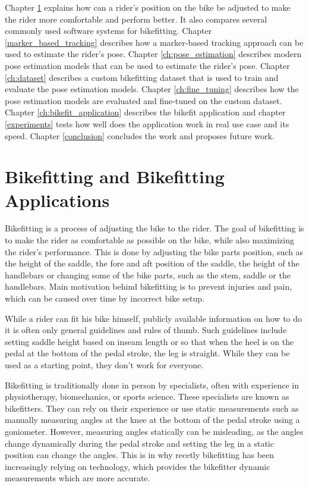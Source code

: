 Chapter \ref{bikefit} explains how can a rider's position on the bike be adjusted to make the rider more comfortable and perform better. It also compares several commonly used software systems for bikefitting. Chapter \ref{marker_based_tracking} describes how a marker-based tracking approach can be used to estimate the rider's pose. Chapter \ref{ch:pose_estimation} describes modern pose estimation models that can be used to estimate the rider's pose. Chapter \ref{ch:dataset} describes a custom bikefitting dataset that is used to train and evaluate the pose estimation models. Chapter \ref{ch:fine_tuning} describes how the pose estimation models are evaluated and fine-tuned on the custom dataset. Chapter \ref{ch:bikefit_application} describes the bikefit application and chapter \ref{experiments} tests how well does the application work in real use case and its speed. Chapter \ref{conclusion} concludes the work and proposes future work.


\chapter{Bikefitting and Bikefitting Applications}
\label{bikefit}
Bikefitting is a process of adjusting the bike to the rider. The goal of bikefitting is to make the rider as comfortable as possible on the bike, while also maximizing the rider's performance. This is done by adjusting the bike parts position, such as the height of the saddle, the fore and aft position of the saddle, the height of the handlebars or changing some of the bike parts, such as the stem, saddle or the handlebars. Main motivation behind bikefitting is to prevent injuries and pain, which can be caused over time by incorrect bike setup.

While a rider can fit his bike himself, publicly available information on how to do it is often only general guidelines and rules of thumb. Such guidelines include setting saddle height based on inseam length or so that when the heel is on the pedal at the bottom of the pedal stroke, the leg is straight. While they can be used as a starting point, they don't work for everyone.

Bikefitting is traditionally done in person by specialists, often with experience in physiotherapy, biomechanics, or sports science. These specialists are known as bikefitters. They can rely on their experience or use static measurements such as manually measuring angles at the knee at the bottom of the pedal stroke using a goniometer. However, measuring angles statically can be misleading, as the angles change dynamically during the pedal stroke and setting the leg in a static position can change the angles. This is in why recetly bikefitting has been increasingly relying on technology, which provides the bikefitter dynamic measurements which are more accurate.

